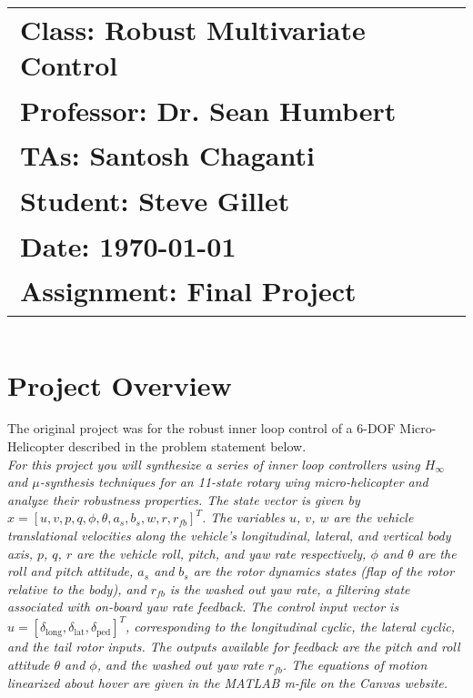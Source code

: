 \documentclass{article}
\begin{document}
\title{
    \begin{tabular}{@{}l@{}}
        \textbf{Class:} Robust Multivariate Control \\ 
        \textbf{Professor:} Dr. Sean Humbert \\ 
        \textbf{TAs:} Santosh Chaganti \\ 
        \textbf{Student:} Steve Gillet \\ 
        \textbf{Date:} \today \\ 
        \textbf{Assignment:} Final Project \\
    \end{tabular}
}

\author{}
\date{}

\maketitle

\section*{Project Overview}

The original project was for the robust inner loop control of a 6-DOF Micro-Helicopter described in the problem statement below. \\

\textit{For this project you will synthesize a series of inner loop controllers using $H_{\infty}$ and $\mu$-synthesis techniques for an 11-state rotary wing micro-helicopter and analyze their robustness properties. The state vector is given by $x = [u, v, p, q, \phi, \theta, a_s, b_s, w, r, r_{fb}]^T$. The variables $u$, $v$, $w$ are the vehicle translational velocities along the vehicle's longitudinal, lateral, and vertical body axis, $p$, $q$, $r$ are the vehicle roll, pitch, and yaw rate respectively, $\phi$ and $\theta$ are the roll and pitch attitude, $a_s$ and $b_s$ are the rotor dynamics states (flap of the rotor relative to the body), and $r_{fb}$ is the washed out yaw rate, a filtering state associated with on-board yaw rate feedback. The control input vector is $u = [\delta_{\text{long}}, \delta_{\text{lat}}, \delta_{\text{ped}}]^T$, corresponding to the longitudinal cyclic, the lateral cyclic, and the tail rotor inputs. The outputs available for feedback are the pitch and roll attitude $\theta$ and $\phi$, and the washed out yaw rate $r_{fb}$. The equations of motion linearized about hover are given in the MATLAB m-file on the Canvas website.}
\end{document}
